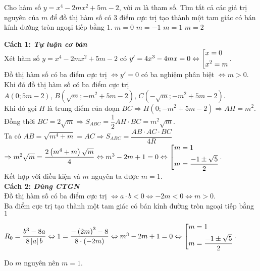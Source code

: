 \begin{vd}%
	Cho hàm số $y=x^4 - 2mx^2+5m-2$, với $m$ là tham số. Tìm tất cả các giá trị nguyên của $m$ để đồ thị hàm số có $3$ điểm cực trị tạo thành một tam giác có bán kính đường tròn ngoại tiếp bằng $1$.
	\choice
	{$m=0$}
	{$m=-1$}
	{\True $m=1$}
	{$m=2$}
	\loigiai
	{\textbf{Cách 1: \textit{Tự luận cơ bản}}\\
		Xét hàm số $y=x^4 - 2mx^2+5m-2$ có $y' = 4x^3 - 4mx = 0 \Leftrightarrow \left[\begin{aligned}&x = 0\\&x^2 = m\end{aligned}\right.$.\\
		Đồ thị hàm số có ba điểm cực trị $\Leftrightarrow y'  = 0$ có ba nghiệm phân biệt $\Leftrightarrow m > 0$.\\
		Khi đó đồ thị hàm số có ba điểm cực trị \\
		$A\left(0;5m - 2\right)$, $B\left(\sqrt{m};- m^2 + 5m - 2\right)$, $C\left(-\sqrt{m};- m^2 + 5m - 2\right)$.\\
		Khi đó gọi $H$ là trung điểm của đoạn $BC \Rightarrow H\left(0;- m^2 + 5m - 2\right) \Rightarrow AH = m^2$.\\
		Đồng thời $BC = 2\sqrt{m} \Rightarrow S_{ABC} = \dfrac{1}{2}AH\cdot BC = m^2\sqrt{m}$.\\
		Ta có $AB = \sqrt{m^4 + m} = AC \Rightarrow S_{ABC} = \dfrac{AB\cdot AC\cdot BC}{4R}$\\
		$\Rightarrow m^2\sqrt{m} = \dfrac{2\left(m^4 + m\right)\sqrt{m}}{4} \Leftrightarrow m^3 - 2m + 1 = 0 \Leftrightarrow \left[\begin{aligned}&m = 1\\&m = \dfrac{- 1 \pm \sqrt{5}}{2}\end{aligned}\right.$. \\
		Kết hợp với điều kiện và $m$ nguyên ta được $m = 1$.\\
		\textbf{Cách 2: \textit{Dùng CTGN}}\\
		Đồ thị hàm số có ba điểm cực trị $\Leftrightarrow a\cdot b < 0 \Leftrightarrow - 2m < 0 \Leftrightarrow m > 0$.\\
		Ba điểm cực trị tạo thành một tam giác có bán kính đường tròn ngoại tiếp bằng $1$
		\begin{center}
			$R_0 = \dfrac{b^3 - 8a}{8\left|a\right|b} \Leftrightarrow 1 = \dfrac{- \left(2m\right)^3 - 8}{8\cdot \left(- 2m\right)} \Leftrightarrow m^3 - 2m + 1 = 0 \Leftrightarrow \left[\begin{aligned}&m = 1\\&m = \dfrac{- 1 \pm \sqrt{5}}{2}\end{aligned}\right.$.\\
		\end{center}
		Do $m$ nguyên nên $m = 1$.
	}
\end{vd}
